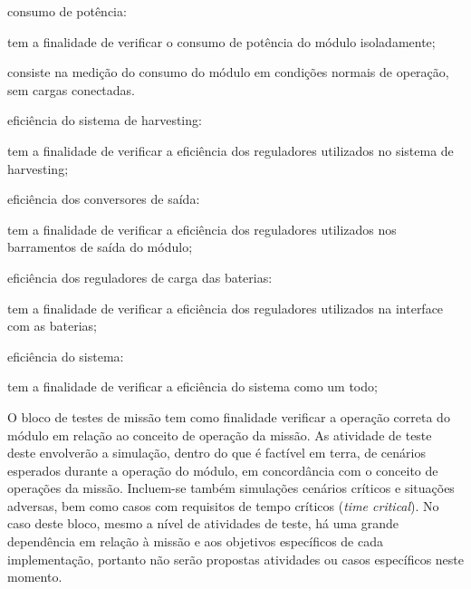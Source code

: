 \begin{alineas}
    \item consumo de potência:
    \begin{alineas}
        \item tem a finalidade de verificar o consumo de potência do módulo isoladamente;
        \item consiste na medição do consumo do módulo em condições normais de operação, sem cargas conectadas.
    \end{alineas}

    \item eficiência do sistema de harvesting:
    \begin{alineas}
        \item tem a finalidade de verificar a eficiência dos reguladores utilizados no sistema de harvesting;
    \end{alineas}

    \item eficiência dos conversores de saída:
    \begin{alineas}
        \item tem a finalidade de verificar a eficiência dos reguladores utilizados nos barramentos de saída do módulo;
    \end{alineas}

    \item eficiência dos reguladores de carga das baterias:
    \begin{alineas}
        \item tem a finalidade de verificar a eficiência dos reguladores utilizados na interface com as baterias;
    \end{alineas}

    \item eficiência do sistema:
    \begin{alineas}
        \item tem a finalidade de verificar a eficiência do sistema como um todo;
    \end{alineas}

\end{alineas}


O bloco de testes de missão tem como finalidade verificar a operação correta do módulo em relação ao conceito de operação da missão.
As atividade de teste deste envolverão a simulação, dentro do que é factível em terra, de cenários esperados durante a operação do módulo, em concordância com o conceito de operações da missão.
Incluem-se também simulações cenários críticos e situações adversas, bem como casos com requisitos de tempo críticos (\textit{time critical}).
No caso deste bloco, mesmo a nível de atividades de teste, há uma grande dependência em relação à missão e aos objetivos específicos de cada implementação, portanto não serão propostas atividades ou casos específicos neste momento.

